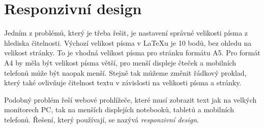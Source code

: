 \documentclass{csbulletin}
\newcommand\program[1]{#1}
\begin{document}







\section{Responzivní design}

Jedním z problémů, který je třeba řešit, je nastavení správné velikosti písma 
z hlediska čitelnosti. 
Výchozí velikost písma v \LaTeX u je 10 bodů, bez ohledu na velikost
stránky. To je vhodná velikost písma pro stránku formátu A5. Pro formát
A4 by měla být velikost písma větší, pro menší displeje čteček a mobilních
telefonů může být naopak menší. Stejně tak můžeme změnit řádkový proklad,
který také ovlivňuje čitelnost textu v závislosti na velikosti písma a 
stránky.

Podobný problém řeší webové prohlížeče,
které musí zobrazit text jak na velkých monitorech PC, tak na
menších displejích notebooků, tabletů a mobilních telefonů. 
Řešení, který používají, se nazývá \textit{responzivní design}.
\end{document}
